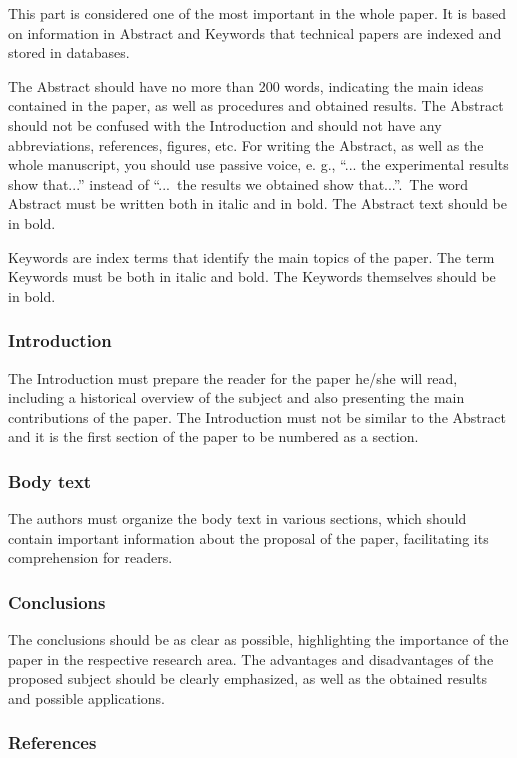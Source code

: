 \documentclass[english]{sobraep}
\begin{document}
This part is considered one of the most important in the whole paper. It is based on information in Abstract and Keywords that technical papers are indexed and stored in databases.

The Abstract should have no more than 200 words, indicating the main ideas contained in the paper, as well as procedures and obtained results. The Abstract should not be confused with the Introduction and should not have any abbreviations, references, figures, etc. For writing the Abstract, as well as the whole manuscript, you should use passive voice, e. g.,  ``... the experimental results show that...'' instead of ``...~the results we obtained show that...''.~The word Abstract must be written both in italic and in bold. The Abstract text should be in bold.

Keywords are index terms that identify the main topics of the paper. The term Keywords must be both in italic and bold. The Keywords themselves should be in bold.

\subsubsection{Introduction}

The Introduction must prepare the reader for the paper he/she will read, including a historical overview of the subject and also presenting the main contributions of the paper. The Introduction must not be similar to the Abstract and it is the first section of the paper to be numbered as a section.

\subsubsection{Body text}

The authors must organize the body text in various sections, which should contain important information about the proposal of the paper, facilitating its comprehension for readers.

\subsubsection{Conclusions}

The conclusions should be as clear as possible, highlighting the importance of the paper in the respective research area. The advantages and disadvantages of the proposed subject should be clearly emphasized, as well as the obtained results and possible applications.

\subsubsection{References}
\end{document}
